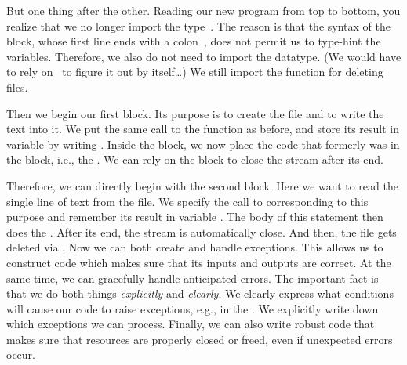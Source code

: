 But one thing after the other.
Reading our new program from top to bottom, you realize that we no longer import the type~.
The reason is that the syntax of the  block, whose first line ends with a colon~\pythonilIdx{:}, does not permit us to type-hint the variables.
Therefore, we also do not need to import the datatype.
(We would have to rely on \mypy\ to figure it out by itself\dots)
We still import the function  for deleting files.

Then we begin our first  block.
Its purpose is to create the file and to write the text into it.
We put the same call to the  function as before, and store its result in variable  by writing .
Inside the  block, we now place the code that formerly was in the  block, i.e., the .
We can rely on the  block to close the stream after its end.

Therefore, we can directly begin with the second  block.
Here we want to read the single line of text from the file.
We specify the call to  corresponding to this purpose and remember its result in variable .
The body of this  statement then does the .
After its end, the stream is automatically close.
And then, the file gets deleted via .%
%
\FloatBarrier%
\endhsection%
%
%
Now we can both create and handle exceptions.
This allows us to construct code which makes sure that its inputs and outputs are correct.
At the same time, we can gracefully handle anticipated errors.
The important fact is that we do both things \emph{explicitly} and \emph{clearly}.
We clearly express what conditions will cause our code to raise exceptions, e.g., in the .
We explicitly write down which exceptions we can process.
Finally, we can also write robust code that makes sure that resources are properly closed or freed, even if unexpected errors occur.%
\endhsection%
\endhsection%
%
%
%
\label{sec:testingExceptions}%
%
%
%
%
%
%
%

